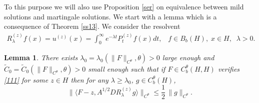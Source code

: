 \documentclass[preprint]{imsart}
\newtheorem{lemma}[theorem]{Lemma}
\begin{document}
 
To this purpose we will also use Proposition \ref{ser} on equivalence between mild solutions and martingale solutions. 
 We start with a lemma which is a consequence of Theorem \ref{ss13}. We consider the resolvent  
\begin{gather} \label{2we} 
 R^{(z)}_{\lambda} f(x) = u^{(z)}(x) =
 \int_0^{\infty} e^{-\lambda t }  P_{t}^{(z  )} f(x) dt, \;\;\; f \in B_b(H),\; x \in H,\;\; \lambda>0.
\end{gather}
\begin{lemma}   \label{stima1} 
There exists   $\lambda_0 = \lambda_0 (\| F \|_{C^{\theta}}, \theta ) >0$ large enough and  ${\tilde C_0}= {\tilde C_0}  (\| F \|_{C^{\theta}}, \theta )>0$ small enough such that if  $F \in C_b^{\theta}(H,H)$ verifies 
 \eqref{111}   for some $z \in H$ then
for any $\lambda  \ge \lambda_0 $, $g \in  C_b^{\theta}(H)$,  
\begin{equation}\label{2dv}
  \|  \langle F - z, A^{1/2} D R^{(z)}_{\lambda} g \rangle \|_{C^{\theta}}
   \le \frac{1}{2}\, \| g  \|_{C^{\theta}}.
\end{equation}
\end{lemma} 
\end{document}
